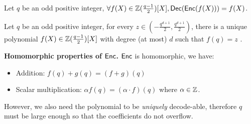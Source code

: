 
\begin{claim}
Let $q$ be an odd positive integer, $\forall f(X) \in \mathbb{Z}(\frac{q-1}{2})[X], \mathsf{Dec}(\mathsf{Enc}(f(X))) = f(X)$.
\end{claim}

\begin{claim}
Let $q$ be an odd positive integer, for every $z \in \left(-\frac{q^{d+1}}{2}, \frac{q^{d+1}}{2}\right)$, there is a unique polynomial $f(X) \in \mathbb{Z}(\frac{q-1}{2})[X]$ with degree (at most) $d$ such that $f(q) = z$ \cite{bunz2020transparent}. 
\end{claim}

\textbf{Homomorphic properties of $\mathsf{Enc}$.} $\mathsf{Enc}$ is homomorphic, we have:
\begin{itemize}
    \item Addition: $f(q) + g(q) = (f + g)(q)$
    \item Scalar multiplication: $\alpha f(q) = (\alpha \cdot f)(q)$ where $\alpha \in \mathbb{Z}$.
\end{itemize}
However, we also need the polynomial to be \textit{uniquely} decode-able, therefore $q$ must be large enough so that the coefficients do not overflow.

